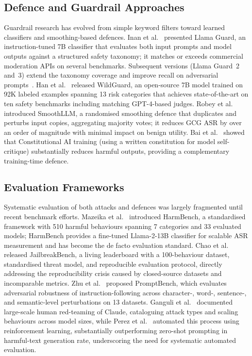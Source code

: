 \documentclass{mdpi}
\begin{document}
\subsection{Defence and Guardrail Approaches}

Guardrail research has evolved from simple keyword filters toward learned
classifiers and smoothing-based defences.  Inan et
al.~\cite{inan2023llamaguard} presented Llama Guard, an instruction-tuned 7B
classifier that evaluates both input prompts and model outputs against a
structured safety taxonomy; it matches or exceeds commercial moderation APIs
on several benchmarks.  Subsequent versions (Llama Guard~2 and~3) extend the
taxonomy coverage and improve recall on adversarial prompts~\cite{metallamaguard2024}.
Han et al.~\cite{han2024wildguard} released WildGuard, an open-source 7B model
trained on 92K labeled examples spanning 13 risk categories that achieves
state-of-the-art on ten safety benchmarks including matching GPT-4-based
judges.  Robey et al.~\cite{robey2023smoothllm} introduced SmoothLLM, a
randomised smoothing defence that duplicates and perturbs input copies,
aggregating majority votes; it reduces GCG ASR by over an order of magnitude
with minimal impact on benign utility.  Bai et al.~\cite{bai2022constitutional}
showed that Constitutional AI training (using a written constitution for model
self-critique) substantially reduces harmful outputs, providing a
complementary training-time defence.

\subsection{Evaluation Frameworks}

Systematic evaluation of both attacks and defences was largely fragmented until
recent benchmark efforts.  Mazeika et al.~\cite{mazeika2024harmbench}
introduced HarmBench, a standardised framework with 510 harmful behaviours
spanning 7 categories and 33 evaluated models; HarmBench provides a
fine-tuned Llama-2-13B classifier for scalable ASR measurement and has become
the de facto evaluation standard.  Chao et al.~\cite{chao2024jailbreakbench}
released JailbreakBench, a living leaderboard with a 100-behaviour dataset,
standardised threat model, and reproducible evaluation protocol, directly
addressing the reproducibility crisis caused by closed-source datasets and
incomparable metrics.  Zhu et al.~\cite{zhu2023promptbench} proposed
PromptBench, which evaluates adversarial robustness of instruction-following
across character-, word-, sentence-, and semantic-level perturbations on 13
datasets.  Ganguli et al.~\cite{ganguli2022redteaming} documented large-scale
human red-teaming of Claude, cataloguing attack types and scaling behaviours
across model sizes, while Perez et al.~\cite{perez2022redteaming} automated
this process using reinforcement learning, substantially outperforming zero-shot prompting in harmful-text generation rate,
underscoring the need for systematic automated evaluation.
\end{document}
